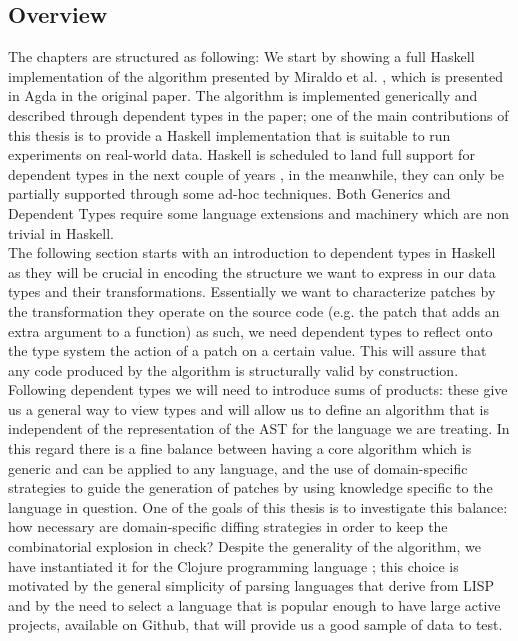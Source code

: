\documentclass[11pt, titlepage]{article}
\begin{document}
\subsection{Overview}\label{overview}
The chapters are structured as following: 
We start by showing a full Haskell implementation of the algorithm presented by Miraldo et al. \cite{type-directed-diff}, which is presented in Agda in the original paper. 
The algorithm is implemented generically and described through dependent types in the paper; one of the main contributions of this thesis is to provide a Haskell implementation that is suitable to run experiments on real-world data. 
Haskell is scheduled to land full support for dependent types in the next couple of years \cite{dependent-haskell}, in the meanwhile, they can only be partially supported through some ad-hoc techniques. 
Both Generics and Dependent Types require some language extensions and machinery which are non trivial in Haskell.
\\
The following section starts with an introduction to dependent types in Haskell as they will be crucial in encoding the structure we want to express in our data types and their transformations. 
Essentially we want to characterize patches by the transformation they operate on the source code (e.g. the patch that adds an extra argument to a function) as such, we need dependent types to reflect onto the type system the action of a patch on a certain value. This will assure that any code produced by the algorithm is structurally valid by construction.
\\
 Following dependent types we will need to introduce sums of products: these give us a general way to view types and will allow us to define an algorithm that is independent of the representation of the AST for the language we are treating. In this regard there is a fine balance between having a core algorithm which is generic and can be applied to any language, and the use of domain-specific strategies to guide the generation of patches by using knowledge specific to the language in question.  
One of the goals of this thesis is to investigate this balance: how necessary are domain-specific diffing strategies in order to keep the combinatorial explosion in check? 
Despite the generality of the algorithm, we have instantiated it for the Clojure programming language \cite{clojure}; this choice is motivated by the general simplicity of parsing languages that derive from LISP and by the need to select a language that is popular enough to have large 
active projects, available on Github, that will provide us a good sample of data to test.
\end{document}
